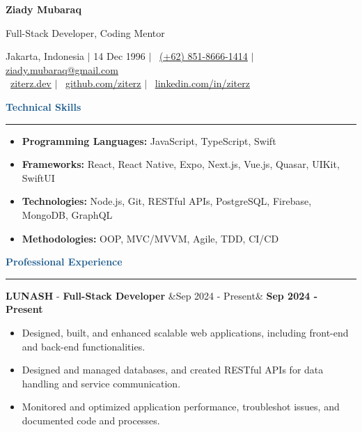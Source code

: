\documentclass{article}
\newcommand{\header}[1]{
	\vspace{2mm}
	{\large \noindent \textcolor[HTML]{19598C}{\textbf{#1}}}
	\vspace{0.5mm}
	\hrule
	\vspace{1.5mm}
}
\newcommand{\skillsheader}[1]{
	\vspace{2mm}
	{\large \noindent \textcolor[HTML]{19598C}{\textbf{#1}}}
	\vspace{1.5mm}
	\hrule
	\vspace{1.5mm}
}
\newcommand{\longitem}[4]{
	\begin{adjustwidth}{}{}
		\MakeUppercase{\textbf{#1}} - \textbf{#3} \hfill \ifx&#2& \else \textbf{#2} \fi \\
	\end{adjustwidth}
	\vspace{-1mm}
}
\newcommand{\skills}[1]{%
	\begin{itemize}[leftmargin=*]\leftskip=0.5em
		\setlength\itemsep{-1mm}
		\vspace{-1mm}
		#1
	\end{itemize}%
}
\newcommand{\liststart}{\begin{itemize}[leftmargin=*]\leftskip=0.5em\vspace{-5mm}}
\newcommand{\listend}{\end{itemize}\vspace{0.2mm}}
\begin{document}
	\begin{flushleft}
		{\LARGE \textbf{Ziady Mubaraq}} \\

		\vspace{1mm}

		{\large Full-Stack Developer, Coding Mentor}

		\vspace{1mm}
		
		Jakarta, Indonesia  $\mid$ 14 Dec 1996 $\mid$ \faWhatsapp ~\href{https://wa.me/6285186661414}{\underline{(+62) 851-8666-1414}} $\mid$ \faEnvelope[regular] \href{mailto:ziady.mubaraq@gmail.com}{\underline{ziady.mubaraq@gmail.com}} \\
		\faLink ~\href{https://ziterz.dev}{\underline{ziterz.dev}}  $\mid$ \faGithub ~\href{https://github.com/ziterz}{\underline{github.com/ziterz}} $\mid$ \faLinkedin ~\href{https://linkedin.com/in/ziterz}{\underline{linkedin.com/in/ziterz}}
	\end{flushleft}

	\vspace{-1mm}

	\skillsheader{Technical Skills}
	\skills{
		\item \textbf{Programming Languages:} JavaScript, TypeScript, Swift
		\item \textbf{Frameworks:} React, React Native, Expo, Next.js, Vue.js, Quasar, UIKit, SwiftUI
		\item \textbf{Technologies:} Node.js, Git, RESTful APIs, PostgreSQL, Firebase, MongoDB, GraphQL
		\item \textbf{Methodologies:} OOP, MVC/MVVM, Agile, TDD, CI/CD
	}		

	\header{Professional Experience}
		\longitem{Lunash}{Sep 2024 - Present}{Full-Stack Developer}{}
		\liststart
			\item Designed, built, and enhanced scalable web applications, including front-end and back-end functionalities. \vspace{-1mm}
			\item Designed and managed databases, and created RESTful APIs for data handling and service communication. \vspace{-1mm}
			\item Monitored and optimized application performance, troubleshot issues, and documented code and processes.
		\listend
		
\end{document}
